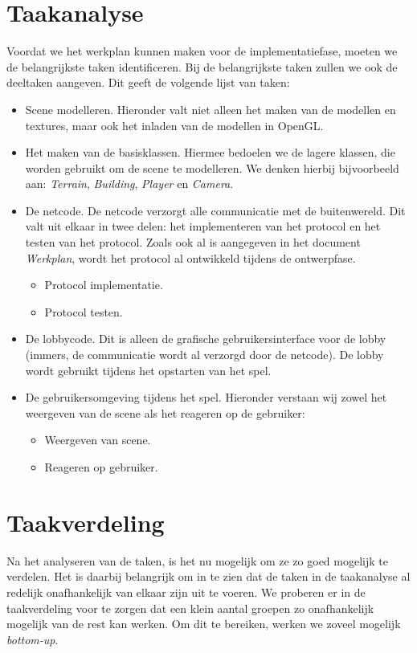 \documentclass[a4paper,11pt]{article}
\begin{document}
	
	
	\tableofcontents
	\newpage
    
    \section{Taakanalyse}
    Voordat we het werkplan kunnen maken voor de implementatiefase, moeten we de belangrijkste taken identificeren. Bij de belangrijkste taken zullen we ook de deeltaken aangeven. Dit geeft de volgende lijst van taken:
    \begin{itemize}
    \item Scene modelleren. Hieronder valt niet alleen het maken van de modellen en textures, maar ook het inladen van de modellen in OpenGL. 
    \item Het maken van de basisklassen. Hiermee bedoelen we de lagere klassen, die worden gebruikt om de scene te modelleren. We denken hierbij bijvoorbeeld aan: \emph{Terrain}, \emph{Building}, \emph{Player} en \emph{Camera}. 
    \item De netcode. De netcode verzorgt alle communicatie met de buitenwereld. Dit valt uit elkaar in twee delen: het implementeren van het protocol en het testen van het protocol. Zoals ook al is aangegeven in het document \emph{Werkplan}, wordt het protocol al ontwikkeld tijdens de ontwerpfase.
        \begin{itemize}
        \item Protocol implementatie.
        \item Protocol testen.
        \end{itemize}
    \item De lobbycode. Dit is alleen de grafische gebruikersinterface voor de lobby (immers, de communicatie wordt al verzorgd door de netcode). De lobby wordt gebruikt tijdens het opstarten van het spel.
    \item De gebruikersomgeving tijdens het spel. Hieronder verstaan wij zowel het weergeven van de scene als het reageren op de gebruiker:
        \begin{itemize}
        \item Weergeven van scene.
        \item Reageren op gebruiker.
        \end{itemize}
    \end{itemize}
 
    \section{Taakverdeling}
    Na het analyseren van de taken, is het nu mogelijk om ze zo goed mogelijk te verdelen. Het is daarbij belangrijk om in te zien dat de taken in de taakanalyse al redelijk onafhankelijk van elkaar zijn uit te voeren. We proberen er in de taakverdeling voor te zorgen dat een klein aantal groepen zo onafhankelijk mogelijk van de rest kan werken. Om dit te bereiken, werken we zoveel mogelijk \emph{bottom-up}. 
    
\end{document}
